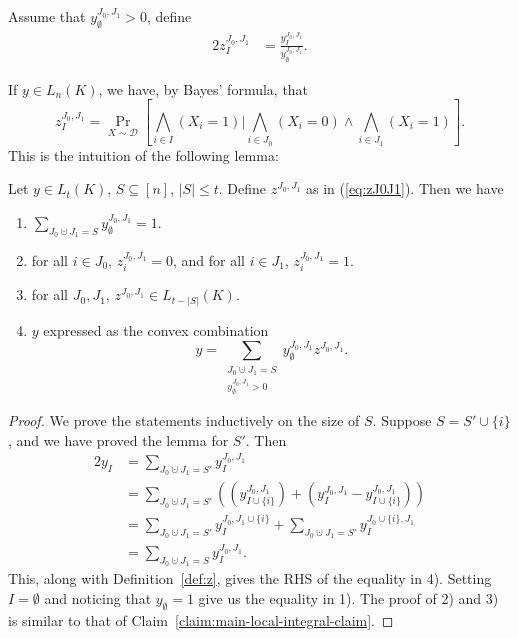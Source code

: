 \documentclass[a4paper,twoside,justified]{tufte-handout}
\begin{document}
\begin{definition}
\label{def:z}
  Assume that $y^{J_0,J_1}_{\emptyset}>0$, define
  \begin{alignat}{2}
    z^{J_0,J_1}_{I} &= \frac{y^{J_0,J_1}_I}{y^{J_0,J_1}_{\emptyset}}. \label{eq:zJ0J1}
  \end{alignat}
\end{definition}
If $y \in L_n(K)$, we have, by Bayes' formula, that
\[
z^{J_0,J_1}_{I} = \Pr_{X \sim \mathscr{D}} \left[ \bigwedge_{i \in I} (X_i=1) | 
\bigwedge_{i \in J_0} (X_i=0) \wedge \bigwedge_{i \in J_1}(X_i=1) \right].
\]
This is the intuition of the following lemma:
\begin{lemma}\label{lemma:local-distribution}
  Let $y \in L_t(K)$, $S \subseteq [n]$, $|S| \le t$. Define $z^{J_0,J_1}$ as in (\ref{eq:zJ0J1}).
  Then we have
  \begin{enumerate}
    \item $\sum_{J_0 \cupdot J_1=S} y^{J_0,J_1}_{\emptyset} = 1$.
    \item for all $i \in J_0$, $z^{J_0,J_1}_{i}=0$, and for all $i \in J_1$, $z^{J_0,J_1}_{i}=1$.
    \item for all $J_0,J_1$, $z^{J_0,J_1} \in L_{t-|S|}(K)$.
    \item $y$ expressed as the convex combination
      \[
      y = \sum_{\substack{J_0 \cupdot J_1=S \\ y^{J_0,J_1}_{\emptyset}>0}} y^{J_0,J_1}_{\emptyset} z^{J_0,J_1}.
      \]
  \end{enumerate}
\end{lemma}
\begin{proof}
  We prove the statements inductively on the size of $S$. Suppose $S=S' \cup \{i\}$, and we have proved the lemma
  for $S'$. Then
  \begin{alignat*}{2}
    y_I &= \sum_{J_0 \cupdot J_1=S'} y^{J_0,J_1}_{I} \\
    &= \sum_{J_0 \cupdot J_1=S'} \left( (y^{J_0,J_1}_{I \cup \{i\}}) + (y^{J_0,J_1}_I - y^{J_0,J_1}_{I \cup \{i\}}) \right) \\
    &= \sum_{J_0 \cupdot J_1 = S'} y^{J_0,J_1 \cup \{i\}}_I + \sum_{J_0 \cupdot J_1=S'} y^{J_0 \cup \{i\},J_1}_I \\
    &= \sum_{J_0 \cupdot J_1=S} y^{J_0,J_1}_I.
  \end{alignat*}
  This, along with Definition~\ref{def:z}, gives the RHS of the equality in 4). Setting $I=\emptyset$ and noticing that $y_{\emptyset}=1$ give us the equality in 1). The proof of 2) and 3) is
  similar to that of Claim~\ref{claim:main-local-integral-claim}. 
\end{proof}
\end{document}

